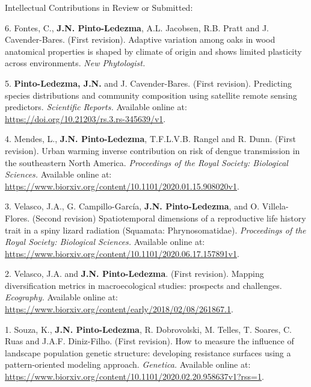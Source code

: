 \documentclass{resume} %
\begin{document}

\begin{rSection}{Intellectual Contributions in Review or Submitted:}

{6.} {Fontes, C.,} {\bf{J.N. Pinto-Ledezma}}, {A.L. Jacobsen, R.B. Pratt and J. Cavender-Bares. (First revision). Adaptive variation among oaks in wood anatomical properties is shaped by climate of origin and shows limited plasticity across environments.} {\em New Phytologist.}

{5.} {\bf{Pinto-Ledezma, J.N.}} {and J. Cavender-Bares. (First revision). Predicting species distributions and community composition using satellite remote sensing predictors.} {\em Scientific Reports.} {Available online at:} \url {https://doi.org/10.21203/rs.3.rs-345639/v1}.

{4.} {Mendes, L.,} {\bf{J.N. Pinto-Ledezma}}, {T.F.L.V.B. Rangel and R. Dunn. (First revision). Urban warming inverse contribution on risk of dengue transmission in the southeastern North America.} {\em Proceedings of the Royal Society: Biological Sciences.} {Available online at:} \url {https://www.biorxiv.org/content/10.1101/2020.01.15.908020v1}.

{3.} {Velasco, J.A., G. Campillo-García,} {\bf{J.N. Pinto-Ledezma}}, {and O. Villela-Flores. (Second revision) Spatiotemporal dimensions of a reproductive life history trait in a spiny lizard radiation (Squamata: Phrynosomatidae).} {\em Proceedings of the Royal Society: Biological Sciences.} {Available online at:} \url {https://www.biorxiv.org/content/10.1101/2020.06.17.157891v1}.

{2.} {Velasco, J.A. and} {\bf{J.N. Pinto-Ledezma}}. {(First revision). Mapping diversification metrics in macroecological studies: prospects and challenges.} {\em Ecography.} {Available online at:} \url {https://www.biorxiv.org/content/early/2018/02/08/261867.1}.

{1.} {Souza, K.,} {\bf{J.N. Pinto-Ledezma}}, {R. Dobrovolski, M. Telles, T. Soares, C. Ruas and J.A.F. Diniz-Filho. (First revision). How to measure the influence of landscape population genetic structure: developing resistance surfaces using a pattern-oriented modeling approach.} {\em Genetica.} {Available online at:} \url {https://www.biorxiv.org/content/10.1101/2020.02.20.958637v1?rss=1}.

\end{rSection}
\end{document}
